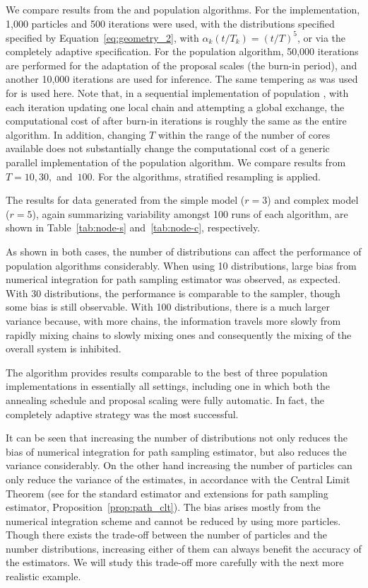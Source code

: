 We compare results from the \smc[2] and population \mcmc algorithms. For the
\smc implementation, 1,000 particles and 500 iterations were used, with the
distributions specified specified by Equation~\eqref{eq:geometry_2}, with
$\alpha_k(t/T_k) = (t/T)^5$, or via the completely adaptive specification. For
the population \mcmc algorithm, 50,000 iterations are performed for the
adaptation of the proposal scales (the burn-in period), and another 10,000
iterations are used for inference. The same tempering as was used for \smc is
used here. Note that, in a sequential implementation of population \mcmc, with
each iteration updating one local chain and attempting a global exchange, the
computational cost of after burn-in iterations is roughly the same as the
entire \smc algorithm. In addition, changing $T$ within the range of the
number of cores available does not substantially change the computational cost
of a generic parallel implementation of the population \mcmc algorithm. We
compare results from $T = 10,30,$ and~$100$. For the \smc algorithms,
stratified resampling is applied.

The results for data generated from the simple model ($r = 3$) and complex
model ($r = 5$), again summarizing variability amongst 100 runs of each
algorithm, are shown in Table~\ref{tab:node-s} and~\ref{tab:node-c},
respectively.

\afterpage{\clearpage}
\afterpage{\clearpage}

As shown in both cases, the number of distributions can affect the performance
of population \mcmc algorithms considerably. When using 10 distributions,
large bias from numerical integration for path sampling estimator was
observed, as expected. With 30 distributions, the performance is comparable to
the \smc[2] sampler, though some bias is still observable. With 100
distributions, there is a much larger variance because, with more chains, the
information travels more slowly from rapidly mixing chains to slowly mixing
ones and consequently the mixing of the overall system is inhibited.

The \smc algorithm provides results comparable to the best of
three population \mcmc implementations in essentially all settings, including
one in which both the annealing schedule and proposal scaling were fully
automatic. In fact, the completely adaptive strategy was the most successful.

It can be seen that increasing the number of distributions not only reduces
the bias of numerical integration for path sampling estimator, but also
reduces the variance considerably. On the other hand increasing the number of
particles can only reduce the variance of the estimates, in accordance with
the Central Limit Theorem (see \cite{DelMoral:2006hc} for the standard
estimator and extensions for path sampling estimator,
Proposition~\ref{prop:path_clt}). The bias arises mostly from the numerical
integration scheme and cannot be reduced by using more particles. Though there
exists the trade-off between the number of particles and the number
distributions, increasing either of them can always benefit the accuracy of
the estimators. We will study this trade-off more carefully with the next more
realistic example.

